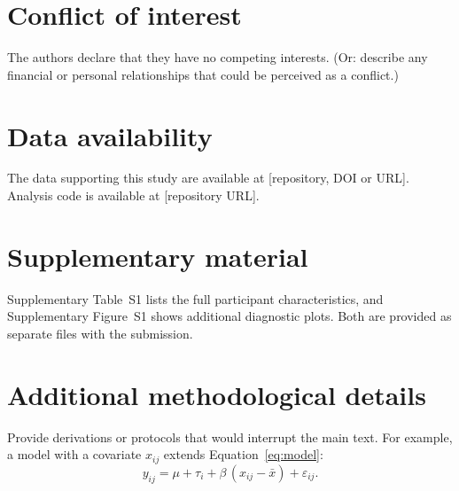 \documentclass[12pt,a4paper]{article}
\begin{document}
\section*{Conflict of interest}
The authors declare that they have no competing interests.
(Or: describe any financial or personal relationships that could be perceived as a conflict.)

\section*{Data availability}
The data supporting this study are available at [repository, DOI or URL]. Analysis
code is available at [repository URL].

\section*{Supplementary material}
Supplementary Table~S1 lists the full participant characteristics, and
Supplementary Figure~S1 shows additional diagnostic plots. Both are provided as
separate files with the submission.

\singlespacing


\doublespacing

\appendix
\renewcommand{\theequation}{A\arabic{equation}}
\setcounter{equation}{0}

\section{Additional methodological details}\label{app:details}
Provide derivations or protocols that would interrupt the main text. For
example, a model with a covariate $x_{ij}$ extends Equation~\eqref{eq:model}:
\begin{equation}\label{eq:ancova}
  y_{ij} = \mu + \tau_i + \beta\,(x_{ij}-\bar{x}) + \varepsilon_{ij}.
\end{equation}
\end{document}
